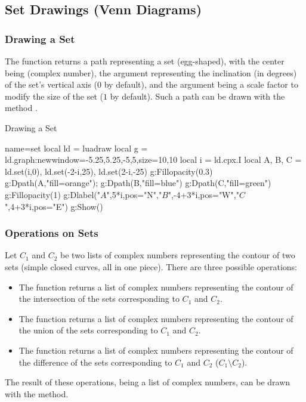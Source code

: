\subsection{Set Drawings (Venn Diagrams)}

\subsubsection{Drawing a Set}

The function  returns a path representing a set (egg-shaped), with the center being  (complex number), the argument  representing the inclination (in degrees) of the set's vertical axis ($0$ by default), and the argument  being a scale factor to modify the size of the set ($1$ by default). Such a path can be drawn with the method .

\begin{demo}{Drawing a Set}
\begin{luadraw}{name=set}
local ld = luadraw
local g = ld.graph:new{window={-5.25,5.25,-5,5},size={10,10}}
local i = ld.cpx.I
local A, B, C = ld.set(i,0), ld.set(-2-i,25), ld.set(2-i,-25)
g:Fillopacity(0.3)
g:Dpath(A,"fill=orange"); g:Dpath(B,"fill=blue")
g:Dpath(C,"fill=green")
g:Fillopacity(1)
g:Dlabel("$A$",5*i,{pos="N"},"$B$",-4+3*i,{pos="W"},"$C$",4+3*i,{pos="E"})
g:Show()
\end{luadraw}
\end{demo}

\subsubsection{Operations on Sets}

Let $C_1$ and $C_2$ be two lists of complex numbers representing the contour of two sets (simple closed curves, all in one piece). There are three possible operations:
\begin{itemize}
    \item The function  returns a list of complex numbers representing the contour of the intersection of the sets corresponding to $C_1$ and $C_2$.
    \item The function  returns a list of complex numbers representing the contour of the union of the sets corresponding to $C_1$ and $C_2$.
    \item The function  returns a list of complex numbers representing the contour of the difference of the sets corresponding to $C_1$ and $C_2$ ($C_1\setminus C_2$).
\end{itemize}
The result of these operations, being a list of complex numbers, can be drawn with the  method.

